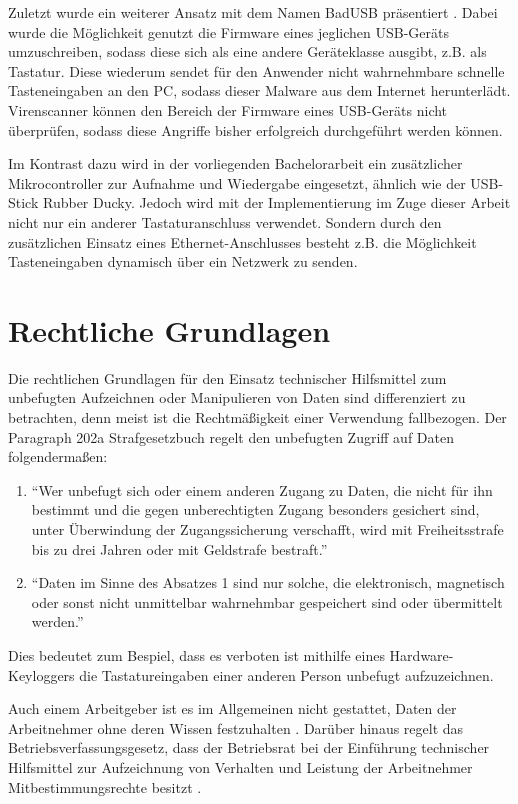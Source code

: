 Zuletzt wurde ein weiterer Ansatz mit dem Namen BadUSB präsentiert \cite{badusb}. Dabei wurde die Möglichkeit genutzt die Firmware eines jeglichen USB-Geräts umzuschreiben, sodass diese sich als eine andere Geräteklasse ausgibt, z.B. als Tastatur. Diese wiederum sendet für den Anwender nicht wahrnehmbare schnelle Tasteneingaben an den PC, sodass dieser Malware aus dem Internet herunterlädt. Virenscanner können den Bereich der Firmware eines USB-Geräts nicht überprüfen, sodass diese Angriffe bisher erfolgreich durchgeführt werden können.

Im Kontrast dazu wird in der vorliegenden Bachelorarbeit ein zusätzlicher Mikrocontroller zur Aufnahme und Wiedergabe eingesetzt, ähnlich wie der USB-Stick Rubber Ducky. Jedoch wird mit der Implementierung im Zuge dieser Arbeit nicht nur ein anderer Tastaturanschluss verwendet. Sondern durch den zusätzlichen Einsatz eines Ethernet-Anschlusses besteht z.B. die Möglichkeit Tasteneingaben dynamisch über ein Netzwerk zu senden.



\section{Rechtliche Grundlagen}
Die rechtlichen Grundlagen für den Einsatz technischer Hilfsmittel zum unbefugten Aufzeichnen oder Manipulieren von Daten sind differenziert zu betrachten, denn meist ist die Rechtmäßigkeit einer Verwendung fallbezogen. Der Paragraph 202a Strafgesetzbuch \cite{stgb} regelt den unbefugten Zugriff auf Daten folgendermaßen:
\begin{enumerate}
  \item ``Wer unbefugt sich oder einem anderen Zugang zu Daten, die nicht für ihn bestimmt und die gegen unberechtigten Zugang besonders gesichert sind, unter Überwindung der Zugangssicherung verschafft, wird mit Freiheitsstrafe bis zu drei Jahren oder mit Geldstrafe bestraft.''
  \item ``Daten im Sinne des Absatzes 1 sind nur solche, die elektronisch, magnetisch oder sonst nicht unmittelbar wahrnehmbar gespeichert sind oder übermittelt werden.''
\end{enumerate}
Dies bedeutet zum Bespiel, dass es verboten ist mithilfe eines Hardware-Keyloggers die Tastatureingaben einer anderen Person unbefugt aufzuzeichnen.

Auch einem Arbeitgeber ist es im Allgemeinen nicht gestattet, Daten der Arbeitnehmer ohne deren Wissen festzuhalten \cite{bildscharbv}. Darüber hinaus regelt das Betriebsverfassungsgesetz, dass der Betriebsrat bei der Einführung technischer Hilfsmittel zur Aufzeichnung von Verhalten und Leistung der Arbeitnehmer Mitbestimmungsrechte besitzt \cite{betrvg}.

